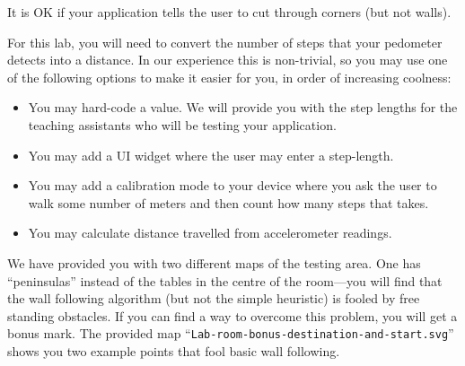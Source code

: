 \documentclass[10pt]{article}
\begin{document}
It is OK if your application tells the user to cut through corners (but not walls).

For this lab, you will need to convert the number of steps that your pedometer detects into a distance. In our experience this is non-trivial, so you may use one of the following options to make it easier for you, in order of increasing coolness:
\vspace*{-1em}
\begin{itemize}
\item You may hard-code a value. We will provide you with the step lengths for the teaching assistants who will be testing your application.
\item You may add a UI widget where the user may enter a step-length.
\item You may add a calibration mode to your device where you ask the user to walk some number of meters and then count how many steps that takes.
\item You may calculate distance travelled from accelerometer readings.
\end{itemize}
\vspace*{-1em}



We have provided you with two different maps of the testing area. One has ``peninsulas'' instead of the tables in the centre of the room---you will find that the wall following algorithm (but not the simple heuristic) is fooled by free standing obstacles. If you can find a way to overcome this problem, you will get a bonus mark. The provided map ``{\tt Lab-room-bonus-destination-and-start.svg}'' shows you two example points that fool basic wall following.
\end{document}
